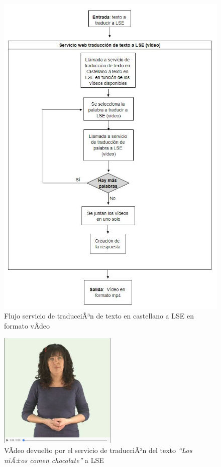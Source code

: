 \begin{figure}[]
	\centering
	\includegraphics[width=1\textwidth]{Imagenes/Fuentes/Text2LSE/FlujoVideoTexto.jpg}
	\caption{ Flujo servicio de traducciÃ³n de texto en castellano a LSE en formato vÃ­deo }
	\label {fig: imgFlujoVideoTextoText2LSE}
\end{figure}

\begin{figure}[]
	\centering
	\includegraphics[width=0.5\textwidth]{Imagenes/Fuentes/Text2LSE/videoOracion.jpg}
	\caption{VÃ­deo devuelto por el servicio de traducciÃ³n del texto \textit{``Los niÃ±os comen chocolate''} a LSE}
	\label {fig: videoOracion}
\end{figure}

